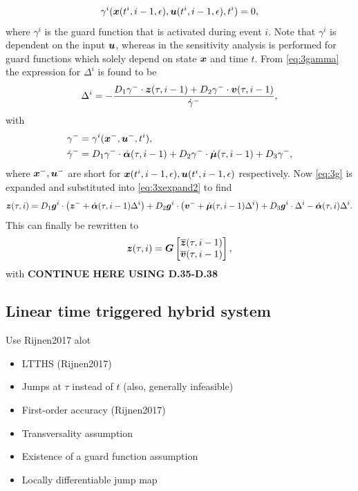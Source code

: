 \documentclass[../DC2017114Bouma.tex]{subfiles}
\begin{document}
\begin{align}
\gamma^{i}({\boldsymbol{x}}(t^{i},i-1,\epsilon),{\boldsymbol{u}}(t^{i},i-1,\epsilon),t^{i}) = 0,\label{eq:3gamma}
\end{align}
where $\gamma^{i}$ is the guard function that is activated during event $i$. Note that $\gamma^{i}$ is dependent on the input ${\boldsymbol{u}}$, whereas in \cite{Chen2018a} the sensitivity analysis is performed for guard functions which solely depend on state ${\boldsymbol{x}}$ and time $t$. From \eqref{eq:3gamma} the expression for $\Delta^{i}$ is found to be
\begin{align}
\Delta^{i} = -\frac{D_1\gamma^-\cdot{\boldsymbol{z}}(\tau,i-1) + D_2\gamma^-\cdot{\boldsymbol{v}}(\tau,i-1)}{\dot{\gamma}^-},\label{eq}
\end{align}
with
\begin{align}
\gamma^- &= \gamma^{i}({\boldsymbol{x}}^-,{\boldsymbol{u}}^-,t^i),\\
\dot{\gamma}^- &= D_1\gamma^-\cdot\dot{\boldsymbol{\alpha}}(\tau,i-1) + D_2\gamma^-\cdot\dot{\boldsymbol{\mu}}(\tau,i-1) + D_3\gamma^-,
\end{align}
where ${\boldsymbol{x}}^-,{\boldsymbol{u}}^-$ are short for ${\boldsymbol{x}}(t^{i},i-1,\epsilon),{\boldsymbol{u}}(t^{i},i-1,\epsilon)$ respectively. Now \eqref{eq:3g} is expanded and substituted  into \eqref{eq:3xexpand2} to find
\begin{align}
{\boldsymbol{z}}(\tau,i) = D_1{\boldsymbol{g}}^i\cdot\left({\boldsymbol{z}}^- + \dot{\boldsymbol{\alpha}}(\tau,i-1)\Delta^i\right) + D_2{\boldsymbol{g}}^i\cdot\left({\boldsymbol{v}}^- + \dot{\boldsymbol{\mu}}(\tau,i-1)\Delta^i\right) + D_3{\boldsymbol{g}}^i\cdot\Delta^i - \dot{\boldsymbol{\alpha}}(\tau,i)\Delta^i.
\end{align}
This can finally be rewritten to
\begin{align}
{\boldsymbol{z}}(\tau,i) = {\boldsymbol{G}}\begin{bmatrix}
\overline{{\boldsymbol{z}}}(\tau,i-1) \\ \overline{{\boldsymbol{v}}}(\tau,i-1)
\end{bmatrix},
\end{align}
with 
\textbf{CONTINUE HERE USING D.35-D.38}

\subsection{Linear time triggered hybrid system}
Use Rijnen2017 alot
\begin{itemize}
\item LTTHS (Rijnen2017)
\item Jumps at $\tau$ instead of $t$ (also, generally infeasible)
\item First-order accuracy (Rijnen2017)
\item Transversality assumption
\item Existence of a guard function assumption
\item Locally differentiable jump map
\end{itemize}
\end{document}
